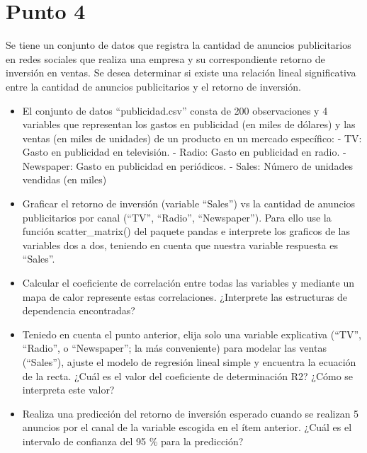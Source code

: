 \documentclass[11pt]{article}
\title{}
\author{}
\date{}
\begin{document}
    
    \maketitle
    
    

    
    \section{Punto 4}\label{punto-4---juan-camilo-vergara}

Se tiene un conjunto de datos que registra la cantidad de anuncios
publicitarios en redes sociales que realiza una empresa y su
correspondiente retorno de inversión en ventas. Se desea determinar si
existe una relación lineal significativa entre la cantidad de anuncios
publicitarios y el retorno de inversión.

\begin{itemize}
\item
  El conjunto de datos ``publicidad.csv'' consta de 200 observaciones y
  4 variables que representan los gastos en publicidad (en miles de
  dólares) y las ventas (en miles de unidades) de un producto en un
  mercado específico: - TV: Gasto en publicidad en televisión. - Radio:
  Gasto en publicidad en radio. - Newspaper: Gasto en publicidad en
  periódicos. - Sales: Número de unidades vendidas (en miles)
\item
  Graficar el retorno de inversión (variable ``Sales'') vs la cantidad
  de anuncios publicitarios por canal (``TV'', ``Radio'',
  ``Newspaper''). Para ello use la función scatter\_matrix() del paquete
  pandas e interprete los graficos de las variables dos a dos, teniendo
  en cuenta que nuestra variable respuesta es ``Sales''.
\item
  Calcular el coeficiente de correlación entre todas las variables y
  mediante un mapa de calor represente estas correlaciones. ¿Interprete
  las estructuras de dependencia encontradas?
\item
  Teniedo en cuenta el punto anterior, elija solo una variable
  explicativa (``TV'', ``Radio'', o ``Newspaper''; la más conveniente)
  para modelar las ventas (``Sales''), ajuste el modelo de regresión
  lineal simple y encuentra la ecuación de la recta. ¿Cuál es el valor
  del coeficiente de determinación R2? ¿Cómo se interpreta este valor?
\item
  Realiza una predicción del retorno de inversión esperado cuando se
  realizan 5 anuncios por el canal de la variable escogida en el ítem
  anterior. ¿Cuál es el intervalo de confianza del 95 \% para la
  predicción?
\end{itemize}
\end{document}
